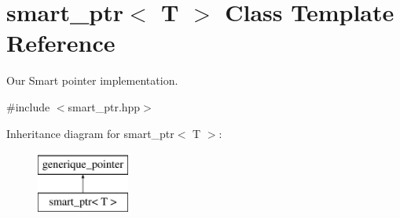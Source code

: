 \hypertarget{classsmart__ptr}{\section{smart\-\_\-ptr$<$ T $>$ Class Template Reference}
\label{classsmart__ptr}
}


Our Smart pointer implementation.  




{\ttfamily \#include $<$smart\-\_\-ptr.\-hpp$>$}

Inheritance diagram for smart\-\_\-ptr$<$ T $>$\-:\begin{figure}[H]
\begin{center}
\leavevmode
\includegraphics[height=2.000000cm]{classsmart__ptr}
\end{center}
\end{figure}
